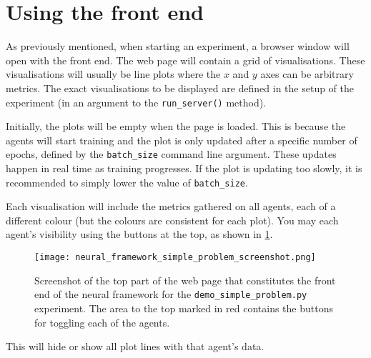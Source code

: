 \section{Using the front end}
\label{sec:using_front_end}
As previously mentioned, when starting an experiment, a browser window will open with the front end.
The web page will contain a grid of visualisations. 
These visualisations will usually be line plots where the $x$ and $y$ axes can be arbitrary metrics.
The exact visualisations to be displayed are defined in the setup of the experiment (in an argument to the \texttt{run\_server()} method).

Initially, the plots will be empty when the page is loaded. 
This is because the agents will start training and the plot is only updated after a specific number of epochs, defined by the \texttt{batch\_size} command line argument.
These updates happen in real time as training progresses.
If the plot is updating too slowly, it is recommended to simply lower the value of \texttt{batch\_size}.

Each visualisation will include the metrics gathered on all agents, each of a different colour (but the colours are consistent for each plot).
You may each agent's visibility using the buttons at the top, as shown in \ref{fig:framework_front_end_screenshot}.
\begin{figure}
    \centering
    \texttt{[image: neural\_framework\_simple\_problem\_screenshot.png]}
    \caption{Screenshot of the top part of the web page that constitutes the front end of the neural framework for the \texttt{demo\_simple\_problem.py} experiment. The area to the top marked in red contains the buttons for toggling each of the agents.}
    \label{fig:framework_front_end_screenshot}
\end{figure}
This will hide or show all plot lines with that agent's data.